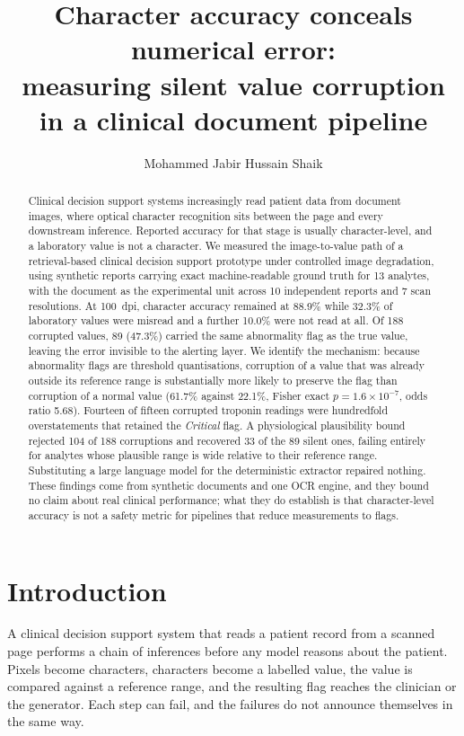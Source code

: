 \documentclass[11pt]{article}
\title{\vspace{-1.5em}\bfseries Character accuracy conceals numerical error:\\
measuring silent value corruption in a clinical document pipeline}
\author[ ]{}
\affil[ ]{\small Author details withheld for double-blind review}
\author[ ]{Mohammed Jabir Hussain Shaik}
\affil[ ]{\small School of Electronics, Electrical Engineering and Computer Science\\
  Queen's University Belfast, United Kingdom\\
  \texttt{mshaik01@qub.ac.uk}}
\date{}
\begin{document}
\maketitle

\begin{abstract}
\noindent
Clinical decision support systems increasingly read patient data from document images, where
optical character recognition sits between the page and every downstream inference. Reported
accuracy for that stage is usually character-level, and a laboratory value is not a character.
We measured the image-to-value path of a retrieval-based clinical decision support prototype
under controlled image degradation, using synthetic reports carrying exact machine-readable
ground truth for 13 analytes, with the document as the experimental unit across 10 independent
reports and 7 scan resolutions. At 100~dpi, character accuracy remained at
88.9\% while 32.3\% of laboratory values were misread and a further
10.0\% were not read at all. Of 188 corrupted values, 89 (47.3\%)
carried the same abnormality flag as the true value, leaving the error invisible to the
alerting layer. We identify the mechanism: because abnormality flags are threshold
quantisations, corruption of a value that was already outside its reference range is
substantially more likely to preserve the flag than corruption of a normal value
(61.7\% against 22.1\%, Fisher exact $p = 1.6 \times 10^{-7}$,
odds ratio 5.68). Fourteen of fifteen corrupted troponin readings were hundredfold
overstatements that retained the \emph{Critical} flag. A physiological plausibility bound
rejected 104 of 188 corruptions and recovered 33 of the 89 silent ones, failing entirely for
analytes whose plausible range is wide relative to their reference range. Substituting a
large language model for the deterministic extractor repaired nothing. These findings come
from synthetic documents and one OCR engine, and they bound no claim about real clinical
performance; what they do establish is that character-level accuracy is not a safety metric
for pipelines that reduce measurements to flags.
\end{abstract}

\section{Introduction}

A clinical decision support system that reads a patient record from a scanned page performs a
chain of inferences before any model reasons about the patient. Pixels become characters,
characters become a labelled value, the value is compared against a reference range, and the
resulting flag reaches the clinician or the generator. Each step can fail, and the failures do
not announce themselves in the same way.
\end{document}
